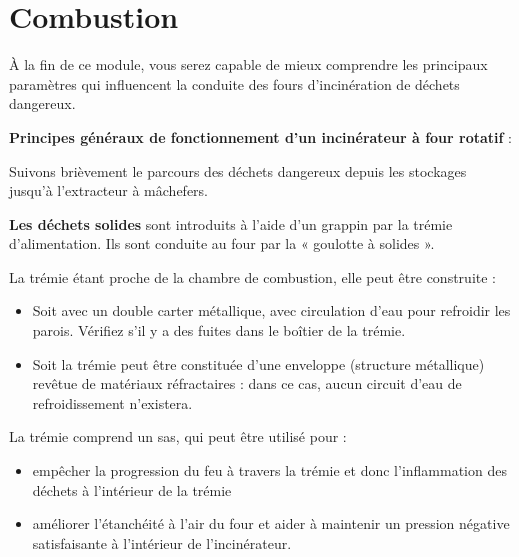 


\chapter{Combustion}

À la fin de ce module, vous serez capable de mieux comprendre les principaux paramètres qui influencent la conduite des fours d’incinération de déchets dangereux.

\vspace{0.3cm}
\textbf{Principes généraux de fonctionnement d'un incinérateur à four rotatif} :
\vspace{0.3cm}

Suivons brièvement le parcours des déchets dangereux depuis les stockages jusqu’à l’extracteur à mâchefers.


\vspace{0.3cm}

\textbf{Les déchets solides} sont introduits à l’aide d’un grappin par la trémie d’alimentation. Ils sont conduite au four par la « goulotte à solides ».

\vspace{0.3cm}

La trémie étant proche de la chambre de combustion, elle peut être construite :
\begin{itemize}
  \item Soit avec un double carter métallique, avec circulation d'eau pour refroidir les parois. Vérifiez s'il y a des fuites dans le boîtier de la trémie.
  \item Soit la trémie peut être constituée d'une enveloppe (structure métallique) revêtue de matériaux réfractaires : dans ce cas, aucun circuit d'eau de refroidissement n'existera.
\end{itemize}


La trémie comprend un sas, qui peut être utilisé pour :
\begin{itemize}
\item empêcher la progression du feu à travers la trémie et donc l'inflammation des déchets à l'intérieur de la trémie
\item améliorer l'étanchéité à l'air du four et aider à maintenir un pression négative satisfaisante à l'intérieur de l'incinérateur.
\end{itemize}


